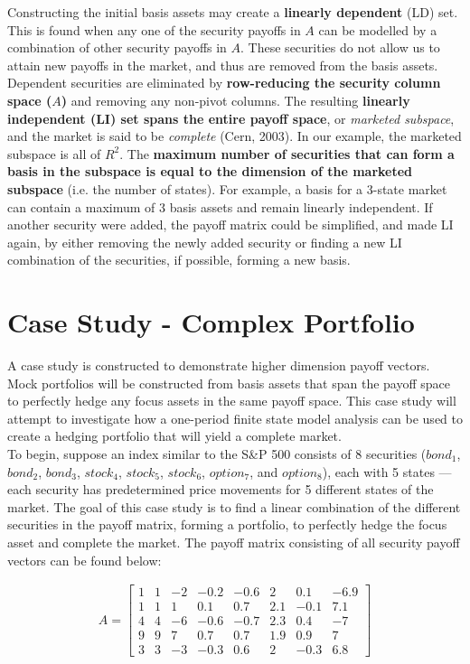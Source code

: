 \documentclass[a4paper,11pt]{report}
\begin{document}
\begin{multicols}{2}
Constructing the initial basis assets may create a \textbf{linearly dependent} (LD) set. 
This is found when any one of the security payoffs in $A$ can be modelled by a combination of other security payoffs in $A$.
These securities do not allow us to attain new payoffs in the market, and thus are removed from the basis assets. 
Dependent securities are eliminated by \textbf{row-reducing the security column space ($A$)} and removing any non-pivot columns. 
The resulting \textbf{linearly independent (LI) set spans the entire payoff space}, or \textit{marketed subspace}, and the market is said to be \textit{complete} (Cern, 2003). 
In our example, the marketed subspace is all of $R^2$.
The \textbf{maximum number of securities that can form a basis in the subspace is equal to the dimension of the marketed subspace} (i.e. the number of states). 
For example, a basis for a 3-state market can contain a maximum of 3 basis assets and remain linearly independent. 
If another security were added, the payoff matrix could be simplified, and made LI again, by either removing the newly added security or finding a new LI combination of the securities, if possible, forming a new basis.

\section{Case Study - Complex Portfolio}
A case study is constructed to demonstrate higher dimension payoff vectors. 
Mock portfolios will be constructed from basis assets that span the payoff space to perfectly hedge any focus assets in the same payoff space. 
This case study will attempt to investigate how a one-period finite state model analysis can be used to create a hedging portfolio that will yield a complete market. 
\\
\indent
To begin, suppose an index similar to the S\&P 500 consists of 8 securities ($bond_1$, $bond_2$, $bond_3$, $stock_4$, $stock_5$, $stock_6$, $option_7$, and $option_8$), each with 5 states --- each security has predetermined price movements for 5 different states of the market.
The goal of this case study is to find a linear combination of the different securities in the payoff matrix, forming a portfolio, to perfectly hedge the focus asset and complete the market. 
The payoff matrix consisting of all security payoff vectors can be found below:

\begin{align*}
	A=\left[\begin{array}{cccccccc}
		1 & 1 & -2 & -0.2 & -0.6 & 2 & 0.1 & -6.9\\ 
		1 & 1 & 1 & 0.1 & 0.7 & 2.1 & -0.1 & 7.1\\
		4 & 4 & -6 & -0.6 & -0.7 & 2.3 & 0.4 & -7 \\
		9 & 9 & 7 & 0.7 & 0.7 & 1.9 & 0.9 & 7 \\
		3 & 3 & -3 & -0.3 & 0.6 & 2 & -0.3 & 6.8
	\end{array}\right]
\end{align*}


\end{multicols}
\end{document}
